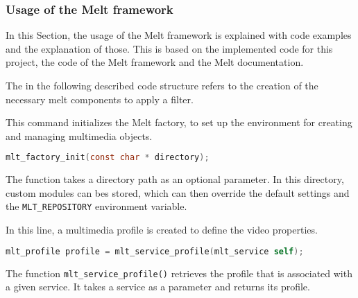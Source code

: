 \documentclass[../MasterThesis.tex]{subfiles}
\begin{document}
\subsubsection*{Usage of the Melt framework}


In this Section, the usage of the Melt framework is explained with code examples and the explanation of those. This is based on the implemented code for this project, the code of the Melt framework and the Melt documentation.~\cite{melt}

The in the following described code structure refers to the creation of the necessary melt components to apply a filter.


\begin{description}[font=\normalfont\color{RedViolet!80!black}, style=nextline]
	
	\item[Initialise the factory] 
	
	This command initializes the Melt factory, to set up the environment for creating and managing multimedia objects.
	
	\begin{lstlisting}[language=C, numbers=none, basicstyle=\footnotesize\ttfamily, belowskip=0pt, aboveskip=9pt]
	mlt_factory_init(const char * directory); \end{lstlisting}

	The function takes a directory path as an optional parameter. In this directory, custom modules can bes stored, which can then override the default settings and the \texttt{MLT\_REPOSITORY} environment variable. 
	
	
	\item[Create a profile]
	
	In this line, a multimedia profile is created to define the video properties.
	
	\begin{lstlisting}[language=C, numbers=none, basicstyle=\footnotesize\ttfamily, belowskip=0pt, aboveskip=9pt]
	mlt_profile profile = mlt_service_profile(mlt_service self); \end{lstlisting}
	
	The function \texttt{mlt\_service\_profile()} retrieves the profile that is associated with a given service. It takes a service as a parameter and returns its profile.
	
	


	\item[Create a producer] 


\end{description}
\end{document}

